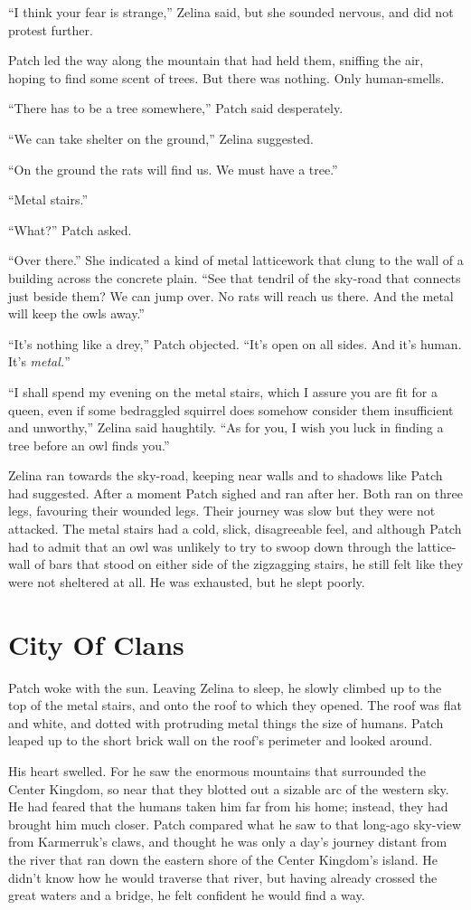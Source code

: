 \documentclass[ebook,oneside,openany,17pt]{memoir}
\renewcommand{\thechapter}{\Roman{chapter}}
\newcounter{sections}
\newcommand{\sections}[1]{%
  \section*{#1}
  \addtocounter{sections}{1}%
  \pdfbookmark[1]{#1}{section.\thechapter.\thesections}}
\begin{document}
“I think your fear is strange,” Zelina said, but she sounded nervous,
and did not protest further.

Patch led the way along the mountain that had held them, sniffing the
air, hoping to find some scent of trees. But there was nothing. Only
human-smells.

“There has to be a tree somewhere,” Patch said desperately.

“We can take shelter on the ground,” Zelina suggested.

“On the ground the rats will find us. We must have a tree.”

“Metal stairs.”

“What?” Patch asked.

“Over there.” She indicated a kind of metal latticework that clung to
the wall of a building across the concrete plain. “See that tendril of
the sky-road that connects just beside them? We can jump over. No rats
will reach us there. And the metal will keep the owls away.”

“It’s nothing like a drey,” Patch objected. “It’s open on all
sides. And it’s human. It’s \emph{metal.}”

“I shall spend my evening on the metal stairs, which I assure you are
fit for a queen, even if some bedraggled squirrel does somehow
consider them insufficient and unworthy,” Zelina said haughtily. “As
for you, I wish you luck in finding a tree before an owl finds you.”

Zelina ran towards the sky-road, keeping near walls and to shadows
like Patch had suggested. After a moment Patch sighed and ran after
her. Both ran on three legs, favouring their wounded legs. Their
journey was slow but they were not attacked. The metal stairs had a
cold, slick, disagreeable feel, and although Patch had to admit that
an owl was unlikely to try to swoop down through the lattice-wall of
bars that stood on either side of the zigzagging stairs, he still felt
like they were not sheltered at all. He was exhausted, but he slept
poorly.


\sections{City Of Clans}

Patch woke with the sun. Leaving Zelina to sleep, he slowly climbed up
to the top of the metal stairs, and onto the roof to which they
opened. The roof was flat and white, and dotted with protruding metal
things the size of humans. Patch leaped up to the short brick wall on
the roof’s perimeter and looked around.

His heart swelled. For he saw the enormous mountains that surrounded
the Center Kingdom, so near that they blotted out a sizable arc of the
western sky. He had feared that the humans taken him far from his
home; instead, they had brought him much closer. Patch compared what
he saw to that long-ago sky-view from Karmerruk’s claws, and thought
he was only a day’s journey distant from the river that ran down the
eastern shore of the Center Kingdom’s island. He didn’t know how he
would traverse that river, but having already crossed the great waters
and a bridge, he felt confident he would find a way.
\end{document}
